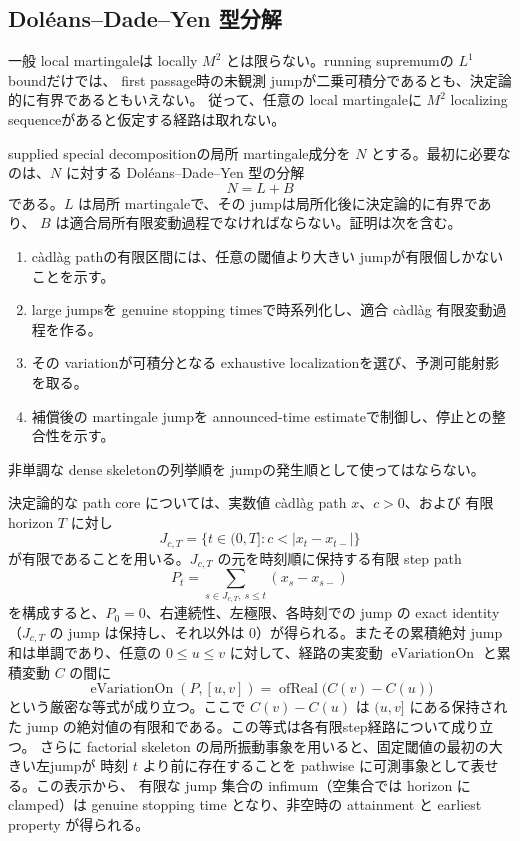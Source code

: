 \subsection{Doléans--Dade--Yen 型分解}

一般 local martingaleは locally $M^2$ とは限らない。running supremumの $L^1$ boundだけでは、
first passage時の未観測 jumpが二乗可積分であるとも、決定論的に有界であるともいえない。
従って、任意の local martingaleに $M^2$ localizing sequenceがあると仮定する経路は取れない。

supplied special decompositionの局所 martingale成分を $N$ とする。最初に必要なのは、$N$ に対する
Doléans--Dade--Yen 型の分解
\[
 N=L+B
\]
である。$L$ は局所 martingaleで、その jumpは局所化後に決定論的に有界であり、
$B$ は適合局所有限変動過程でなければならない。証明は次を含む。
\begin{enumerate}
\item c\`adl\`ag pathの有限区間には、任意の閾値より大きい jumpが有限個しかないことを示す。
\item large jumpsを genuine stopping timesで時系列化し、適合 c\`adl\`ag 有限変動過程を作る。
\item その variationが可積分となる exhaustive localizationを選び、予測可能射影を取る。
\item 補償後の martingale jumpを announced-time estimateで制御し、停止との整合性を示す。
\end{enumerate}
非単調な dense skeletonの列挙順を jumpの発生順として使ってはならない。

決定論的な path core については、実数値 càdlàg path $x$、$c>0$、および
有限 horizon $T$ に対し
\[
 J_{c,T}=\{t\in(0,T]:c<|x_t-x_{t-}|\}
\]
が有限であることを用いる。$J_{c,T}$ の元を時刻順に保持する有限 step path
\[
 P_t=\sum_{s\in J_{c,T},\ s\leq t}(x_s-x_{s-})
\]
を構成すると、$P_0=0$、右連続性、左極限、各時刻での jump の exact identity
（$J_{c,T}$ の jump は保持し、それ以外は $0$）が得られる。またその累積絶対
jump 和は単調であり、任意の $0\leq u\leq v$ に対して、経路の実変動
$\operatorname{eVariationOn}$ と累積変動 $C$ の間に
\[
\operatorname{eVariationOn}(P,[u,v])
 = \operatorname{ofReal}\bigl(C(v)-C(u)\bigr)
\]
という厳密な等式が成り立つ。ここで $C(v)-C(u)$ は $(u,v]$ にある保持された
jump の絶対値の有限和である。この等式は各有限step経路について成り立つ。
さらに factorial skeleton の局所振動事象を用いると、固定閾値の最初の大きい左jumpが
時刻 $t$ より前に存在することを pathwise に可測事象として表せる。この表示から、
有限な jump 集合の infimum（空集合では horizon に clamped）は genuine stopping time
となり、非空時の attainment と earliest property が得られる。

